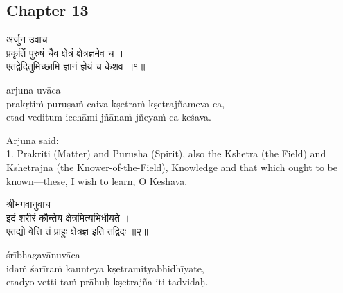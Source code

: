 \chapterdrop

\begin{center}

\headerspace
{}

\section{Chapter 13}

\headerspace
{}

\headerspace
{}

\headerspace
{}

\headerspace
\end{center}

\begin{gitaverse}
अर्जुन उवाच \\
प्रकृतिं पुरुषं चैव क्षेत्रं क्षेत्रज्ञमेव च । \\
एतद्वेदितुमिच्छामि ज्ञानं ज्ञेयं च केशव ॥१॥
\end{gitaverse}

\begin{transliteration}
arjuna uvāca \\
prakṛtiṁ puruṣaṁ caiva kṣetraṁ kṣetrajñameva ca, \\
etad-veditum-icchāmi jñānaṁ jñeyaṁ ca keśava.
\end{transliteration}

Arjuna said: \\
1. Prakriti (Matter) and Purusha (Spirit), also the Kshetra (the Field) and
Kshetrajna (the Knower-of-the-Field), Knowledge and that which ought to be
known---these, I wish to learn, O Keshava.

\begin{gitaverse}
श्रीभगवानुवाच \\
इदं शरीरं कौन्तेय क्षेत्रमित्यभिधीयते । \\
एतद्यो वेत्ति तं प्राहुः क्षेत्रज्ञ इति तद्विदः ॥२॥
\end{gitaverse}

\begin{transliteration}
śrībhagavānuvāca \\
idaṁ śarīraṁ kaunteya kṣetramityabhidhīyate, \\
etadyo vetti taṁ prāhuḥ kṣetrajña iti tadvidaḥ.
\end{transliteration}

